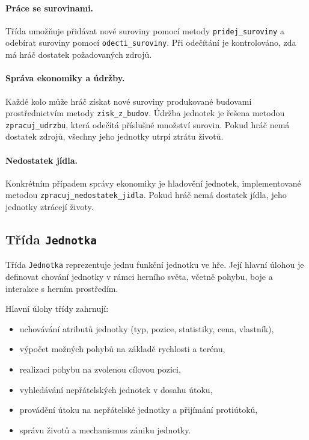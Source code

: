 \paragraph{Práce se surovinami.}
Třída umožňuje přidávat nové suroviny pomocí metody \texttt{pridej\_suroviny} a odebírat suroviny pomocí \texttt{odecti\_suroviny}. Při odečítání je kontrolováno, zda má hráč dostatek požadovaných zdrojů.

\paragraph{Správa ekonomiky a údržby.}
Každé kolo může hráč získat nové suroviny produkované budovami prostřednictvím metody \texttt{zisk\_z\_budov}. Údržba jednotek je řešena metodou \texttt{zpracuj\_udrzbu}, která odečítá příslušné množství surovin. Pokud hráč nemá dostatek zdrojů, všechny jeho jednotky utrpí ztrátu životů.

\paragraph{Nedostatek jídla.}
Konkrétním případem správy ekonomiky je hladovění jednotek, implementované metodou \texttt{zpracuj\_nedostatek\_jidla}. Pokud hráč nemá dostatek jídla, jeho jednotky ztrácejí životy.


\subsection{Třída \texttt{Jednotka}}

Třída \texttt{Jednotka} reprezentuje jednu funkční jednotku ve hře. Její hlavní úlohou je definovat chování jednotky v rámci herního světa, včetně pohybu, boje a interakce s herním prostředím.

Hlavní úlohy třídy zahrnují:
\begin{itemize}
    \item uchovávání atributů jednotky (typ, pozice, statistiky, cena, vlastník),
    \item výpočet možných pohybů na základě rychlosti a terénu,
    \item realizaci pohybu na zvolenou cílovou pozici,
    \item vyhledávání nepřátelských jednotek v dosahu útoku,
    \item provádění útoku na nepřátelské jednotky a přijímání protiútoků,
    \item správu životů a mechanismus zániku jednotky.
\end{itemize}

